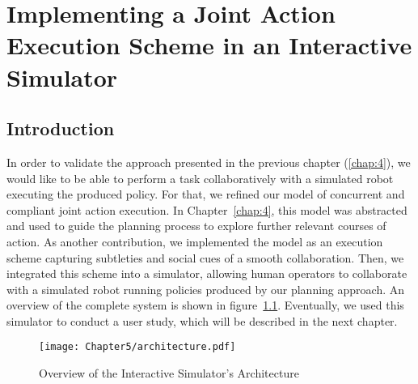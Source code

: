 \newpage
\thispagestyle{empty}
\mbox{}

\ifdefined{}
\else
\setcounter{chapter}{4} %
\dominitoc
\faketableofcontents
\fi

\chapter{Implementing a Joint Action Execution Scheme in an Interactive Simulator}
\label{chap:5}
\minitoc


\section{Introduction}

In order to validate the approach presented in the previous chapter (\ref{chap:4}), we would like to be able to perform a task collaboratively with a simulated robot executing the produced policy.
For that, we refined our model of concurrent and compliant joint action execution. In Chapter~\ref{chap:4}, this model was abstracted and used to guide the planning process to explore further relevant courses of action. As another contribution, we implemented the model as an execution scheme capturing subtleties and social cues of a smooth collaboration. Then, we integrated this scheme into a simulator, allowing human operators to collaborate with a simulated robot running policies produced by our planning approach. An overview of the complete system is shown in figure~\ref{fig:architecture}.
Eventually, we used this simulator to conduct a user study, which will be described in the next chapter. 


\begin{figure}[h]
    \texttt{[image: Chapter5/architecture.pdf]}
    \caption{Overview of the Interactive Simulator's Architecture}
    \label{fig:architecture}
\end{figure}

